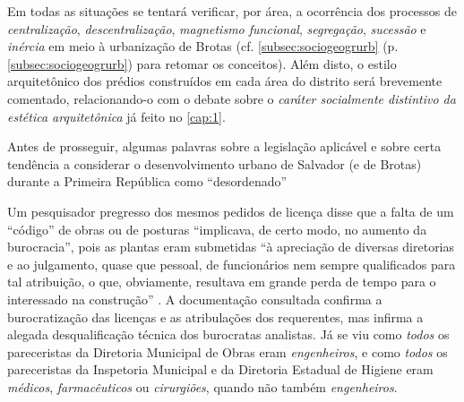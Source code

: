 Em todas as situações se tentará verificar, por área, a ocorrência dos processos de \textit{centralização}, \textit{descentralização}, \textit{magnetismo funcional}, \textit{segregação}, \textit{sucessão} e \textit{inércia} em meio à urbanização de Brotas (cf. \autoref{subsec:sociogeogrurb} (p. \autoref{subsec:sociogeogrurb}) para retomar os conceitos). Além disto, o estilo arquitetônico dos prédios construídos em cada área do distrito será brevemente comentado, relacionando-o com o debate sobre o \textit{caráter socialmente distintivo da estética arquitetônica} já feito no \autoref{cap:1}.

Antes de prosseguir, algumas palavras sobre a legislação aplicável e sobre certa tendência a considerar o desenvolvimento urbano de Salvador (e de Brotas) durante a Primeira República como ``desordenado''

Um pesquisador pregresso dos mesmos pedidos de licença disse que a falta de um ``código'' de obras ou de posturas ``implicava, de certo modo, no aumento da burocracia'', pois as plantas eram submetidas ``à apreciação de diversas diretorias e ao julgamento, quase que pessoal, de funcionários nem sempre qualificados para tal atribuição, o que, obviamente, resultava em grande perda de tempo para o interessado na construção'' \cite[p.~89]{cardoso_vilas_1991}. A documentação consultada confirma a burocratização das licenças e as atribulações dos requerentes, mas infirma a alegada desqualificação técnica dos burocratas analistas. Já se viu como \textit{todos} os pareceristas da Diretoria Municipal de Obras eram \textit{engenheiros}, e como \textit{todos} os pareceristas da Inspetoria Municipal e da Diretoria Estadual de Higiene eram \textit{médicos}, \textit{farmacêuticos} ou \textit{cirurgiões}, quando não também \textit{engenheiros}. 

